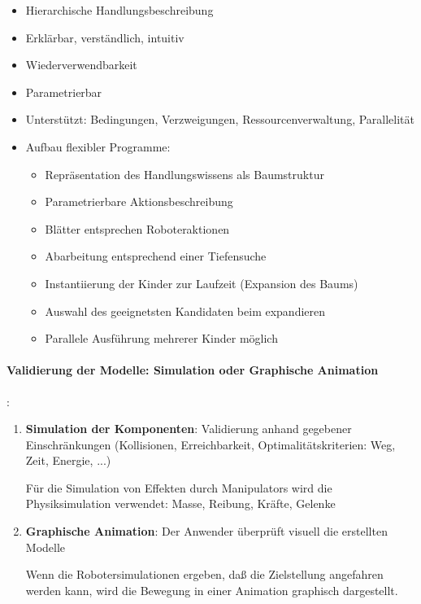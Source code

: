 \begin{itemize}
\item Hierarchische Handlungsbeschreibung
\item Erklärbar, verständlich, intuitiv
\item Wiederverwendbarkeit
\item Parametrierbar
\item Unterstützt: Bedingungen, Verzweigungen, Ressourcenverwaltung, Parallelität
\item Aufbau flexibler Programme:
\begin{itemize}
\item Repräsentation des Handlungswissens als Baumstruktur
\item Parametrierbare Aktionsbeschreibung
\item Blätter entsprechen Roboteraktionen
\item Abarbeitung entsprechend einer Tiefensuche
\item Instantiierung der Kinder zur Laufzeit (Expansion des Baums)
\item Auswahl des geeignetsten Kandidaten beim expandieren
\item Parallele Ausführung mehrerer Kinder möglich
\end{itemize}
\end{itemize}
\paragraph*{Validierung der Modelle: Simulation oder Graphische Animation}:
\begin{enumerate}
\item \textbf{Simulation der Komponenten}: Validierung anhand gegebener Einschränkungen (Kollisionen, Erreichbarkeit, Optimalitätskriterien: Weg, Zeit, Energie, ...)
\begin{itemize}
\ita Für die Simulation von Effekten durch Manipulators wird die Physiksimulation verwendet: Masse, Reibung, Kräfte, Gelenke
\end{itemize}
\item \textbf{Graphische Animation}: Der Anwender überprüft visuell die erstellten Modelle
\begin{itemize}
\ita Wenn die Robotersimulationen ergeben, daß die Zielstellung angefahren werden kann, wird die Bewegung in einer Animation graphisch dargestellt.
\end{itemize}
\end{enumerate}

